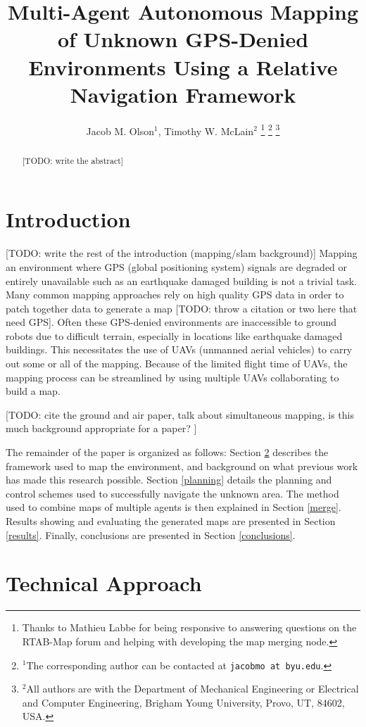 \documentclass[letterpaper, 10 pt, conference]{ieeeconf}  %
\title{\LARGE \bf
Multi-Agent Autonomous Mapping of Unknown GPS-Denied Environments Using a Relative Navigation Framework}
\author{Jacob M. Olson$^{1}$, Timothy W. McLain$^{2}$%
\thanks{Thanks to Mathieu Labbe for being responsive to answering questions on the RTAB-Map forum and helping with developing the map merging node.}%
\thanks{$^{1}$The corresponding author can be contacted at
        {\tt\small jacobmo at byu.edu}.}%
\thanks{$^{2}$All authors are with the Department of Mechanical Engineering or Electrical and Computer Engineering,
        Brigham Young University, Provo, UT, 84602, USA.}%
}
\newcommand{\todo}[1]{{\color{blue}[TODO: #1]}}
\begin{document}
\maketitle
\thispagestyle{empty}
\pagestyle{empty}


\begin{abstract}

\todo{write the abstract}

\end{abstract}


\section{Introduction}

\todo{write the rest of the introduction (mapping/slam background)}
Mapping an environment where GPS (global positioning system) signals are degraded or entirely unavailable such as an earthquake damaged building is not a trivial task. Many common mapping approaches rely on high quality GPS data in order to patch together data to generate a map \todo{throw a citation or two here that need GPS}. Often these GPS-denied environments are inaccessible to ground robots due to difficult terrain, especially in locations like earthquake damaged buildings. This necessitates the use of UAVs (unmanned aerial vehicles) to carry out some or all of the mapping. Because of the limited flight time of UAVs, the mapping process can be streamlined by using multiple UAVs collaborating to build a map.

\todo{cite the ground and air paper, talk about simultaneous mapping, is this much background appropriate for a paper? }


The remainder of the paper is organized as follows: Section \ref{approach} describes the framework used to map the environment, and background on what previous work has made this research possible. Section \ref{planning} details the planning and control schemes used to successfully navigate the unknown area. The method used to combine maps of multiple agents is then explained in Section \ref{merge}. Results showing and evaluating the generated maps are presented in Section \ref{results}. Finally, conclusions are presented in Section \ref{conclusions}.

\section{Technical Approach}\label{approach}
\end{document}
